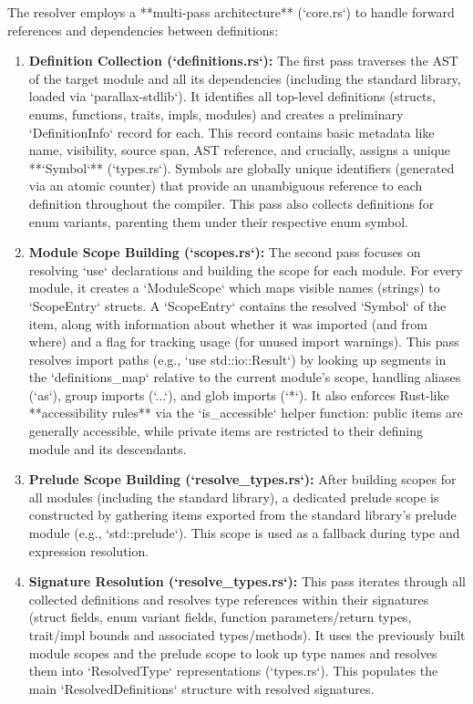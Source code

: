 The resolver employs a **multi-pass architecture** (`core.rs`) to handle forward references and dependencies between definitions:
\begin{enumerate}
    \item \textbf{Definition Collection (`definitions.rs`):} The first pass traverses the AST of the target module and all its dependencies (including the standard library, loaded via `parallax-stdlib`). It identifies all top-level definitions (structs, enums, functions, traits, impls, modules) and creates a preliminary `DefinitionInfo` record for each. This record contains basic metadata like name, visibility, source span, AST reference, and crucially, assigns a unique **`Symbol`** (`types.rs`). Symbols are globally unique identifiers (generated via an atomic counter) that provide an unambiguous reference to each definition throughout the compiler. This pass also collects definitions for enum variants, parenting them under their respective enum symbol.
    \item \textbf{Module Scope Building (`scopes.rs`):} The second pass focuses on resolving `use` declarations and building the scope for each module. For every module, it creates a `ModuleScope` which maps visible names (strings) to `ScopeEntry` structs. A `ScopeEntry` contains the resolved `Symbol` of the item, along with information about whether it was imported (and from where) and a flag for tracking usage (for unused import warnings). This pass resolves import paths (e.g., `use std::io::Result`) by looking up segments in the `definitions_map` relative to the current module's scope, handling aliases (`as`), group imports (`{{...}}`), and glob imports (`*`). It also enforces Rust-like **accessibility rules** via the `is_accessible` helper function: public items are generally accessible, while private items are restricted to their defining module and its descendants.
    \item \textbf{Prelude Scope Building (`resolve_types.rs`):} After building scopes for all modules (including the standard library), a dedicated prelude scope is constructed by gathering items exported from the standard library's prelude module (e.g., `std::prelude`). This scope is used as a fallback during type and expression resolution.
    \item \textbf{Signature Resolution (`resolve_types.rs`):} This pass iterates through all collected definitions and resolves type references within their signatures (struct fields, enum variant fields, function parameters/return types, trait/impl bounds and associated types/methods). It uses the previously built module scopes and the prelude scope to look up type names and resolves them into `ResolvedType` representations (`types.rs`). This populates the main `ResolvedDefinitions` structure with resolved signatures.

\end{enumerate}
